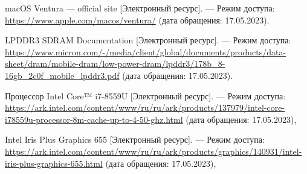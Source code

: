 \begin{thebibliography}{}
%	
%
%
	
	macOS Ventura --- official site [Электронный
	ресурс]. --- Режим доступа: \url{https://www.apple.com/macos/ventura/} (дата обращения: 17.05.2023).

	LPDDR3 SDRAM Documentation [Электронный
	ресурс]. --- Режим доступа: \url{https://www.micron.com/-/media/client/global/documents/products/data-sheet/dram/mobile-dram/low-power-dram/lpddr3/178b_8-16gb_2c0f_mobile_lpddr3.pdf} (дата обращения: 17.05.2023).

	Процессор Intel Core™ i7-8559U [Электронный ресурс]. --- Режим доступа: \url{https://ark.intel.com/content/www/ru/ru/ark/products/137979/intel-core-i78559u-processor-8m-cache-up-to-4-50-ghz.html} (дата обращения: 17.05.2023),
	
	Intel Iris Plus Graphics 655 [Электронный ресурс]. --- Режим доступа: \url{https://ark.intel.com/content/www/ru/ru/ark/products/graphics/140931/intel-iris-plus-graphics-655.html} (дата обращения: 17.05.2023),

\end{thebibliography}
\endgroup

\pagebreak